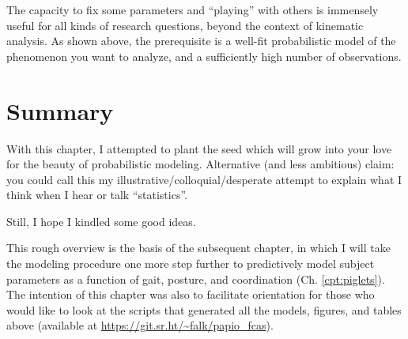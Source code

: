 The capacity to fix some parameters and ``playing'' with others is immensely useful for all kinds of research questions, beyond the context of kinematic analysis.
As shown above, the prerequisite is a well-fit probabilistic model of the phenomenon you want to analyze, and a sufficiently high number of observations.



\FloatBarrier
\clearpage
\section{Summary}
\label{sec:org527d8db}
With this chapter, I attempted to plant the seed which will grow into your love for the beauty of probabilistic modeling.
Alternative (and less ambitious) claim: you could call this my illustrative/colloquial/desperate attempt to explain what I think when I hear or talk ``statistics''.

Still, I hope I kindled some good ideas.
\medskip

This rough overview is the basis of the subsequent chapter, in which I will take the modeling procedure one more step further to predictively model subject parameters as a function of gait, posture, and coordination (Ch. \ref{cpt:piglets}).
The intention of this chapter was also to facilitate orientation for those who would like to look at the scripts that generated all the models, figures, and tables above (available at \url{https://git.sr.ht/~falk/papio_fcas}).


\FloatBarrier
\clearpage

\nocite{Gelman2013}

% 
% 
